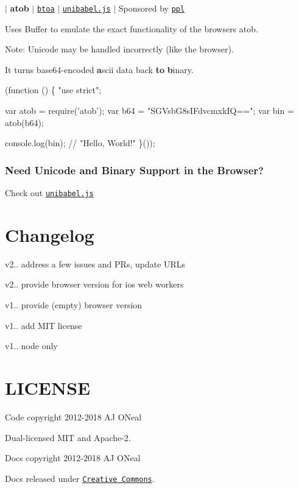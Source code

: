 $\vert$ {\bfseries atob} $\vert$ \href{https://git.coolaj86.com/coolaj86/btoa.js}{\tt btoa} $\vert$ \href{https://git.coolaj86.com/coolaj86/unibabel.js}{\tt unibabel.\+js} $\vert$ Sponsored by \href{https://ppl.family}{\tt ppl}

Uses {\ttfamily Buffer} to emulate the exact functionality of the browser\textquotesingle{}s atob.

Note\+: Unicode may be handled incorrectly (like the browser).

It turns base64-\/encoded {\bfseries a}scii data back {\bfseries to} {\bfseries b}inary.


\begin{DoxyCode}
(function () \{
  "use strict";

  var atob = require('atob');
  var b64 = "SGVsbG8sIFdvcmxkIQ==";
  var bin = atob(b64);

  console.log(bin); // "Hello, World!"
\}());
\end{DoxyCode}


\subsubsection*{Need Unicode and Binary Support in the Browser?}

Check out \href{https://git.coolaj86.com/coolaj86/unibabel.js}{\tt unibabel.\+js}

\section*{Changelog }


\begin{DoxyItemize}
\item v2.. address a few issues and P\+Rs, update U\+R\+Ls
\item v2.. provide browser version for ios web workers
\item v1.. provide (empty) browser version
\item v1.. add M\+IT license
\item v1.. node only
\end{DoxyItemize}

\section*{L\+I\+C\+E\+N\+SE }

Code copyright 2012-\/2018 AJ O\+Neal

Dual-\/licensed M\+IT and Apache-\/2.

Docs copyright 2012-\/2018 AJ O\+Neal

Docs released under \href{https://git.coolaj86.com/coolaj86/atob.js/blob/master/LICENSE.DOCS}{\tt Creative Commons}. 